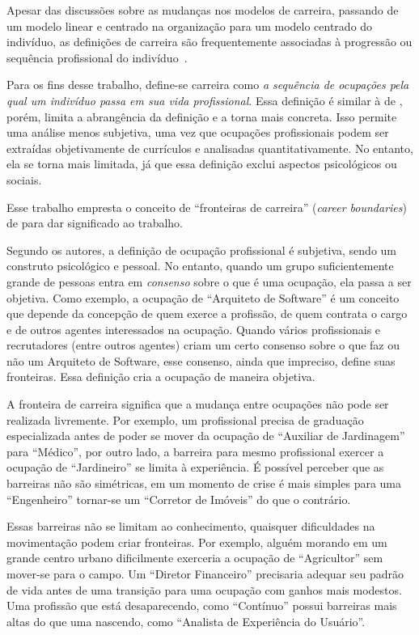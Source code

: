 \documentclass[
  article,
  11pt,
  a4paper,
  english,
  brazil,
  sumario=tradicional]{abntex2}
\begin{document}
Apesar das discussões sobre as mudanças nos modelos de carreira, passando de um modelo linear e centrado na organização para um modelo centrado do indivíduo, as definições de carreira são frequentemente associadas à progressão ou sequência profissional do indivíduo~\cite{Baruch2004-oy,Sullivan2009-xb,Bendassolli2009-bg}.

Para os fins desse trabalho, define-se carreira como \textit{a sequência de ocupações pela qual um indivíduo passa em sua vida profissional}. Essa definição é similar à de , porém, limita a abrangência da definição e a torna mais concreta. Isso permite uma análise menos subjetiva, uma vez que ocupações profissionais podem ser extraídas objetivamente de currículos e analisadas quantitativamente. No entanto, ela se torna mais limitada, já que essa definição exclui aspectos psicológicos ou sociais.

Esse trabalho empresta o conceito de \enquote{fronteiras de carreira} (\textit{career boundaries}) de  para dar significado ao trabalho.

Segundo os autores, a definição de ocupação profissional é subjetiva, sendo um construto psicológico e pessoal. No entanto, quando um grupo suficientemente grande de pessoas entra em \textit{consenso} sobre o que é uma ocupação, ela passa a ser objetiva. Como exemplo, a ocupação de \enquote{Arquiteto de Software} é um conceito que depende da concepção de quem exerce a profissão, de quem contrata o cargo e de outros agentes interessados na ocupação. Quando vários profissionais e recrutadores (entre outros agentes) criam um certo consenso sobre o que faz ou não um Arquiteto de Software, esse consenso, ainda que impreciso, define suas fronteiras. Essa definição cria a ocupação de maneira objetiva.

A fronteira de carreira significa que a mudança entre ocupações não pode ser realizada livremente. Por exemplo, um profissional precisa de graduação especializada antes de poder se mover da ocupação de \enquote{Auxiliar de Jardinagem} para \enquote{Médico}, por outro lado, a barreira para mesmo profissional exercer a ocupação de \enquote{Jardineiro} se limita à experiência. É possível perceber que as barreiras não são simétricas, em um momento de crise é mais simples para uma \enquote{Engenheiro} tornar-se um \enquote{Corretor de Imóveis} do que o contrário.

Essas barreiras não se limitam ao conhecimento, quaisquer dificuldades na movimentação podem criar fronteiras. Por exemplo, alguém morando em um grande centro urbano dificilmente exerceria a ocupação de \enquote{Agricultor} sem mover-se para o campo. Um \enquote{Diretor Financeiro} precisaria adequar seu padrão de vida antes de uma transição para uma ocupação com ganhos mais modestos. Uma profissão que está desaparecendo, como \enquote{Contínuo} possui barreiras mais altas do que uma nascendo, como \enquote{Analista de Experiência do Usuário}.
\end{document}
